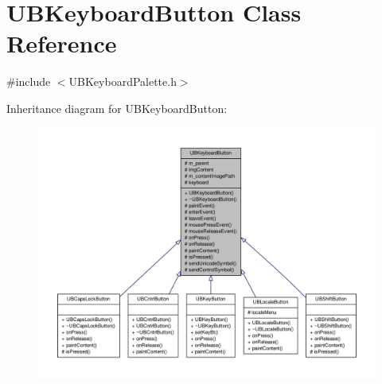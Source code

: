 \hypertarget{class_u_b_keyboard_button}{\section{U\-B\-Keyboard\-Button Class Reference}
\label{d2/d05/class_u_b_keyboard_button}
}


{\ttfamily \#include $<$U\-B\-Keyboard\-Palette.\-h$>$}



Inheritance diagram for U\-B\-Keyboard\-Button\-:
\nopagebreak
\begin{figure}[H]
\begin{center}
\leavevmode
\includegraphics[width=350pt]{d1/d28/class_u_b_keyboard_button__inherit__graph}
\end{center}
\end{figure}


